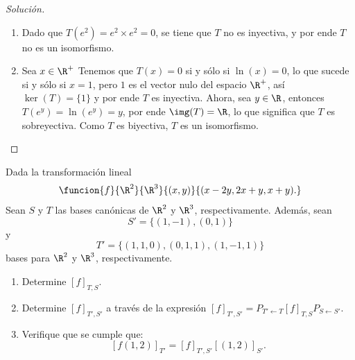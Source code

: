 \documentclass[a4,11pt]{aleph-notas}
\begin{document}
\begin{proof}[Solución]
\begin{enumerate}
        \item Dado que $T(e^2) = e^2\times e^2 = 0$, se tiene que $T$ no es inyectiva, y por ende $T$ no es un isomorfismo.
        \item Sea $x\in\R^+$ Tenemos que $T(x)=0$ si y sólo si $\ln(x)=0$, lo que sucede si y sólo si $x=1$, pero $1$ es el vector nulo del espacio $\R^+$, así $\ker(T)=\{1\}$ y por ende $T$ es inyectiva. Ahora, sea $y\in\R$, entonces $T(e^y) = \ln(e^y) = y$, por ende $\img(T)=\R$, lo que significa que $T$ es sobreyectiva. Como $T$ es biyectiva, $T$ es un isomorfismo.
    \end{enumerate}
\end{proof}

\begin{ejer}
    Dada la transformación lineal
    \[
        \funcion{f}{\R^{2}}{\R^{3}}{(x,y)}{(x-2y,2x+y,x+y).}
    \]
    Sean $S$ y $T$ las bases canónicas de $\R^{2}$ y $\R^{3}$, respectivamente. Además, sean 
    \[
        S' = \{(1, -1),(0, 1)\}
    \] 
    y
    \[
        T' = \{(1,1,0), (0,1,1), (1,-1,1)\}
    \]
    bases para $\R^{2}$ y $\R^{3}$, respectivamente.
    \begin{enumerate}
        \item Determine $[f]_{T,S}$. %
        \item Determine $[f]_{T',S'}$ a través de la expresión $[f]_{T',S'} = P_{T'\leftarrow T} [f]_{T,S} P_{S\leftarrow S'}$.
        \item Verifique que se cumple que:
        \[
            [f(1,2)]_{T'} = [f]_{T',S'}[(1,2)]_{S'}.
        \]
    \end{enumerate}
\end{ejer}
\end{document}
